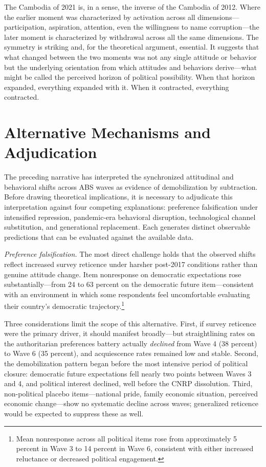 \documentclass[
  12pt,
  letterpaper]{article}
\begin{document}
The Cambodia of 2021 is, in a sense, the inverse of the Cambodia of
2012. Where the earlier moment was characterized by activation across
all dimensions---participation, aspiration, attention, even the
willingness to name corruption---the later moment is characterized by
withdrawal across all the same dimensions. The symmetry is striking and,
for the theoretical argument, essential. It suggests that what changed
between the two moments was not any single attitude or behavior but the
underlying orientation from which attitudes and behaviors derive---what
might be called the perceived horizon of political possibility. When
that horizon expanded, everything expanded with it. When it contracted,
everything contracted.

\section{Alternative Mechanisms and
Adjudication}\label{alternative-mechanisms-and-adjudication}

The preceding narrative has interpreted the synchronized attitudinal and
behavioral shifts across ABS waves as evidence of demobilization by
subtraction. Before drawing theoretical implications, it is necessary to
adjudicate this interpretation against four competing explanations:
preference falsification under intensified repression, pandemic-era
behavioral disruption, technological channel substitution, and
generational replacement. Each generates distinct observable predictions
that can be evaluated against the available data.

\emph{Preference falsification.} The most direct challenge holds that
the observed shifts reflect increased survey reticence under harsher
post-2017 conditions rather than genuine attitude change. Item
nonresponse on democratic expectations rose substantially---from 24 to
63 percent on the democratic future item---consistent with an
environment in which some respondents feel uncomfortable evaluating
their country's democratic trajectory.\footnote{Mean nonresponse across
  all political items rose from approximately 5 percent in Wave 3 to 14
  percent in Wave 6, consistent with either increased reluctance or
  decreased political engagement.}

Three considerations limit the scope of this alternative. First, if
survey reticence were the primary driver, it should manifest
broadly---but straightlining rates on the authoritarian preferences
battery actually \emph{declined} from Wave 4 (38 percent) to Wave 6 (35
percent), and acquiescence rates remained low and stable. Second, the
demobilization pattern began before the most intensive period of
political closure: democratic future expectations fell nearly two points
between Waves 3 and 4, and political interest declined, well before the
CNRP dissolution. Third, non-political placebo items---national pride,
family economic situation, perceived economic change---show no
systematic decline across waves; generalized reticence would be expected
to suppress these as well.
\end{document}
